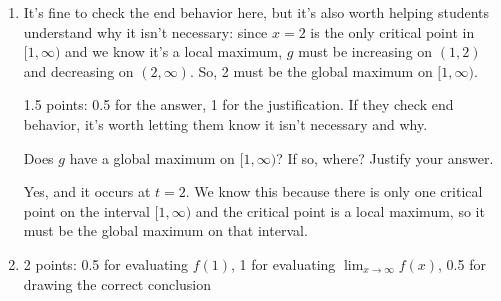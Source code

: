 \documentclass{article}
\begin{document}
\begin{enumerate}
\begin{enumerate}
\begin{solution}
      \begin{center}
      \end{center}
      Based on the sign chart, , 
      and .
    \end{solution}

  \item

    \begin{workshop}
      It's fine to check the end behavior here, but it's also worth helping students understand why it isn't necessary: since $x = 2$ is the only critical point in $[1, \infty)$ and we know it's a local maximum, $g$ must be increasing on $(1, 2)$ and decreasing on $(2, \infty)$. So, 2 must be the global maximum on $[1, \infty)$.
    \end{workshop}

    \begin{grading}
      1.5 points: 0.5 for the answer, 1 for the justification. If they check end behavior, it's worth letting them know it isn't necessary and why. 
    \end{grading}

    \begin{problem}[\vfill\newpage]
      Does $g$ have a global maximum on $[1, \infty)$? If so, where? Justify your answer. 
    \end{problem}

    \begin{solution}
      Yes, and it occurs at $t=2$. We know this because there is only one critical
      point on the interval $[1, \infty)$ and the critical point is a local maximum,
      so it must be the global maximum on that interval.
    \end{solution}

  \item

    \begin{grading}
      2 points: 0.5 for evaluating $f(1)$, 1 for evaluating $\displaystyle \lim_{x \to \infty} f(x)$, 0.5 for drawing the correct conclusion 
    \end{grading}


\end{enumerate}
\end{enumerate}
\end{document}
